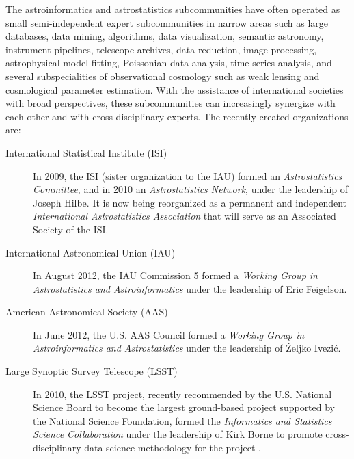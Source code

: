 The astroinformatics and astrostatistics subcommunities have often operated as small semi-independent expert subcommunities in narrow areas such as large databases, data mining, algorithms, data visualization, semantic astronomy, instrument pipelines, telescope archives, data reduction, image processing, astrophysical model fitting, Poissonian data analysis, time series analysis, and several subspecialities of observational cosmology such as weak lensing and cosmological parameter estimation.  With the assistance of international societies with broad perspectives, these subcommunities can increasingly synergize with each other and with cross-disciplinary experts.   The recently created organizations are:

\begin{description}

\item[International Statistical Institute (ISI)]  In 2009, the ISI (sister organization to the IAU) formed an {\it {}Astrostatistics Committee}, and in 2010 an {\it {}Astrostatistics Network}, under the leadership of Joseph Hilbe. It is now being reorganized as a permanent and independent {\it International Astrostatistics Association} that will serve as an Associated Society of the ISI. 

\item[International Astronomical Union (IAU)]  In August 2012, the IAU Commission 5 formed a {\it Working Group in Astrostatistics and Astroinformatics} under the leadership of Eric Feigelson.

\item[American Astronomical Society (AAS)]  In June 2012, the U.S. AAS Council formed a {\it Working Group in Astroinformatics and Astrostatistics} under the leadership of \v{Z}eljko Ivezi\'c.

\item[Large Synoptic Survey Telescope (LSST)] In 2010, the LSST project, recently recommended by the U.S. National Science Board to become the largest ground-based project supported by the National Science Foundation,   formed the {\it {}Informatics and Statistics Science Collaboration}  under the leadership of Kirk Borne to promote cross-disciplinary data science methodology for the project \citep{borne2010}.  

\end{description}

